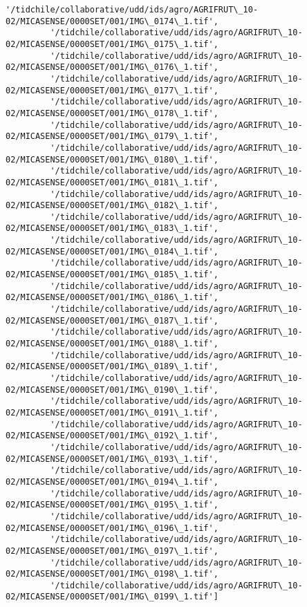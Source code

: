 \documentclass[11pt]{article}
\begin{document}
\begin{Verbatim}[commandchars=\\\{\}]
         '/tidchile/collaborative/udd/ids/agro/AGRIFRUT\_10-02/MICASENSE/0000SET/001/IMG\_0174\_1.tif',
         '/tidchile/collaborative/udd/ids/agro/AGRIFRUT\_10-02/MICASENSE/0000SET/001/IMG\_0175\_1.tif',
         '/tidchile/collaborative/udd/ids/agro/AGRIFRUT\_10-02/MICASENSE/0000SET/001/IMG\_0176\_1.tif',
         '/tidchile/collaborative/udd/ids/agro/AGRIFRUT\_10-02/MICASENSE/0000SET/001/IMG\_0177\_1.tif',
         '/tidchile/collaborative/udd/ids/agro/AGRIFRUT\_10-02/MICASENSE/0000SET/001/IMG\_0178\_1.tif',
         '/tidchile/collaborative/udd/ids/agro/AGRIFRUT\_10-02/MICASENSE/0000SET/001/IMG\_0179\_1.tif',
         '/tidchile/collaborative/udd/ids/agro/AGRIFRUT\_10-02/MICASENSE/0000SET/001/IMG\_0180\_1.tif',
         '/tidchile/collaborative/udd/ids/agro/AGRIFRUT\_10-02/MICASENSE/0000SET/001/IMG\_0181\_1.tif',
         '/tidchile/collaborative/udd/ids/agro/AGRIFRUT\_10-02/MICASENSE/0000SET/001/IMG\_0182\_1.tif',
         '/tidchile/collaborative/udd/ids/agro/AGRIFRUT\_10-02/MICASENSE/0000SET/001/IMG\_0183\_1.tif',
         '/tidchile/collaborative/udd/ids/agro/AGRIFRUT\_10-02/MICASENSE/0000SET/001/IMG\_0184\_1.tif',
         '/tidchile/collaborative/udd/ids/agro/AGRIFRUT\_10-02/MICASENSE/0000SET/001/IMG\_0185\_1.tif',
         '/tidchile/collaborative/udd/ids/agro/AGRIFRUT\_10-02/MICASENSE/0000SET/001/IMG\_0186\_1.tif',
         '/tidchile/collaborative/udd/ids/agro/AGRIFRUT\_10-02/MICASENSE/0000SET/001/IMG\_0187\_1.tif',
         '/tidchile/collaborative/udd/ids/agro/AGRIFRUT\_10-02/MICASENSE/0000SET/001/IMG\_0188\_1.tif',
         '/tidchile/collaborative/udd/ids/agro/AGRIFRUT\_10-02/MICASENSE/0000SET/001/IMG\_0189\_1.tif',
         '/tidchile/collaborative/udd/ids/agro/AGRIFRUT\_10-02/MICASENSE/0000SET/001/IMG\_0190\_1.tif',
         '/tidchile/collaborative/udd/ids/agro/AGRIFRUT\_10-02/MICASENSE/0000SET/001/IMG\_0191\_1.tif',
         '/tidchile/collaborative/udd/ids/agro/AGRIFRUT\_10-02/MICASENSE/0000SET/001/IMG\_0192\_1.tif',
         '/tidchile/collaborative/udd/ids/agro/AGRIFRUT\_10-02/MICASENSE/0000SET/001/IMG\_0193\_1.tif',
         '/tidchile/collaborative/udd/ids/agro/AGRIFRUT\_10-02/MICASENSE/0000SET/001/IMG\_0194\_1.tif',
         '/tidchile/collaborative/udd/ids/agro/AGRIFRUT\_10-02/MICASENSE/0000SET/001/IMG\_0195\_1.tif',
         '/tidchile/collaborative/udd/ids/agro/AGRIFRUT\_10-02/MICASENSE/0000SET/001/IMG\_0196\_1.tif',
         '/tidchile/collaborative/udd/ids/agro/AGRIFRUT\_10-02/MICASENSE/0000SET/001/IMG\_0197\_1.tif',
         '/tidchile/collaborative/udd/ids/agro/AGRIFRUT\_10-02/MICASENSE/0000SET/001/IMG\_0198\_1.tif',
         '/tidchile/collaborative/udd/ids/agro/AGRIFRUT\_10-02/MICASENSE/0000SET/001/IMG\_0199\_1.tif']
\end{Verbatim}
            
\end{document}
